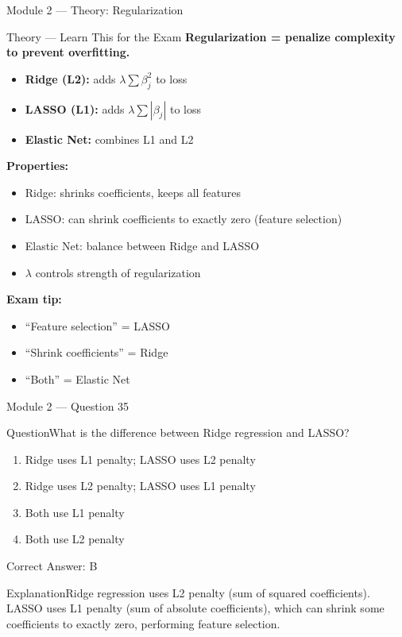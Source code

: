 \documentclass[aspectratio=169,10pt]{beamer}
\newcommand{\question}[1]{\begin{block}{Question}#1\end{block}}
\newcommand{\options}[4]{%
	\begin{enumerate}[label=\Alph*.,leftmargin=*]
		\item #1
		\item #2
		\item #3
		\item #4
	\end{enumerate}
}
\newcommand{\answerbox}[1]{\begin{exampleblock}{Correct Answer: #1}\end{exampleblock}}
\newcommand{\explain}[1]{\begin{block}{Explanation}#1\end{block}}
\newcommand{\theory}[1]{%
	\begin{block}{Theory --- Learn This for the Exam}
		\small #1
	\end{block}
}
\begin{document}
	\begin{frame}{Module 2 --- Theory: Regularization}
		\theory{
			\textbf{Regularization = penalize complexity to prevent overfitting.}
			\begin{itemize}
				\item \textbf{Ridge (L2):} adds $\lambda \sum \beta_j^2$ to loss
				\item \textbf{LASSO (L1):} adds $\lambda \sum |\beta_j|$ to loss
				\item \textbf{Elastic Net:} combines L1 and L2
			\end{itemize}
			\textbf{Properties:}
			\begin{itemize}
				\item Ridge: shrinks coefficients, keeps all features
				\item LASSO: can shrink coefficients to exactly zero (feature selection)
				\item Elastic Net: balance between Ridge and LASSO
				\item $\lambda$ controls strength of regularization
			\end{itemize}
			\textbf{Exam tip:}
			\begin{itemize}
				\item ``Feature selection'' = LASSO
				\item ``Shrink coefficients'' = Ridge
				\item ``Both'' = Elastic Net
			\end{itemize}
		}
	\end{frame}
	
	\begin{frame}{Module 2 --- Question 35}
		\question{What is the difference between Ridge regression and LASSO?}
		\options{Ridge uses L1 penalty; LASSO uses L2 penalty}{Ridge uses L2 penalty; LASSO uses L1 penalty}{Both use L1 penalty}{Both use L2 penalty}
		\answerbox{B}
		\explain{Ridge regression uses L2 penalty (sum of squared coefficients). LASSO uses L1 penalty (sum of absolute coefficients), which can shrink some coefficients to exactly zero, performing feature selection.}
	\end{frame}
	
\end{document}
